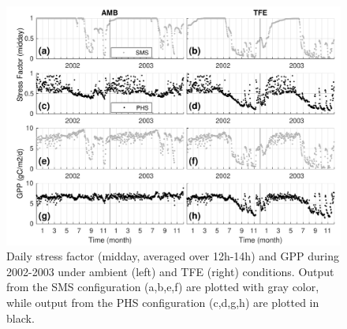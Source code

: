 \documentclass[draft,linenumbers]{agujournal}
\begin{document}
          \clearpage   
  \begin{figure}[h]
     \centering
     \includegraphics[width=30pc]{../figs3/gpp.pdf}
     \caption{Daily stress factor (midday, averaged over 12h-14h) and GPP during 2002-2003 under ambient (left) and TFE (right) conditions.
     Output from the SMS configuration (a,b,e,f) are plotted with gray color, while output from the PHS configuration (c,d,g,h) are plotted in black.
     }
     \label{fig:gpp}
  \end{figure} 
         
\end{document}
